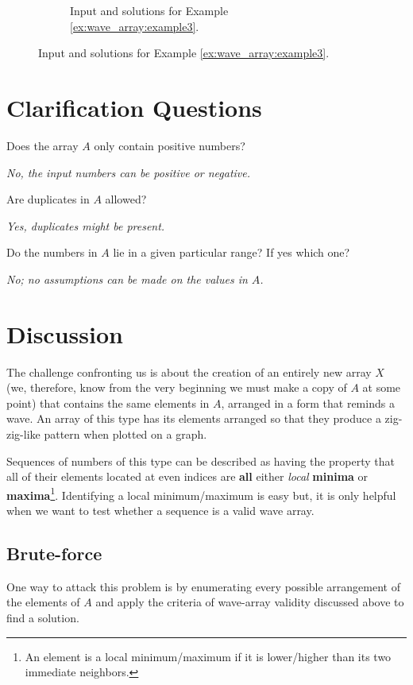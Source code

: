\begin{figure}
\begin{subfigure}[t]{0.80\textwidth}
		 \caption{Input and solutions for Example \ref{ex:wave_array:example3}.}
		 \label{fig:dice_rolls:20faces_dice}
	  \end{subfigure}
\end{figure}


\section{Clarification Questions}

\begin{QandA}
	\item Does the array $A$ only contain positive numbers?
	\begin{answered}
		\textit{No, the input numbers can be positive or negative.}
	\end{answered}
	\item Are duplicates in $A$ allowed?
	\begin{answered}
		\textit{Yes, duplicates might be present.}
	\end{answered}
	\item Do the numbers in $A$ lie in a given particular range? If yes which one?
	\begin{answered}
		\textit{No; no assumptions can be made on the values in $A$.}
	\end{answered}
\end{QandA}

\section{Discussion}
\label{wave_array:sec:discussion}
The challenge confronting us is about the creation of an entirely new array $X$ (we, therefore, know from the very beginning we must make a copy of $A$ at some point) that contains the same elements in $A$, arranged in a form that reminds a wave. 
An array of this type has its elements arranged so that they produce a zig-zig-like pattern when plotted on a graph. 

Sequences of numbers of this type can be described as having the property that all of their elements located at even indices are \textbf{all} either 
\textit{local}  \textbf{minima} or  \textbf{maxima}\footnote{An element is a local minimum/maximum if it is lower/higher than its two immediate neighbors.}. 
Identifying a local minimum/maximum is easy but, it is only helpful when we want to test whether a sequence is a valid wave array.

\subsection{Brute-force}
\label{wave_array:sec:bruteforce}
One way to attack this problem is by enumerating every possible arrangement of the elements of $A$ and apply the criteria of wave-array validity discussed above to find a solution. 

